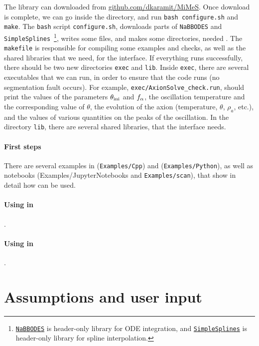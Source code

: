 \documentclass[11pt,a4paper]{article}
\begin{document}
The library can downloaded from \href{https://github.com/dkaramit/MiMeS}{github.com/dkaramit/MiMeS}. Once download is complete, we can go inside the \mimes directory, and run {\tt bash configure.sh} and  {\tt make}.  The {\tt bash} script {\tt configure.sh}, downloads parts of {\tt NaBBODES} and {\tt SimpleSplines}~\footnote{\href{https://github.com/dkaramit/NaBBODES}{\tt NaBBODES} is header-only library for ODE integration, and \href{https://github.com/dkaramit/SimpleSplines}{\tt SimpleSplines} is header-only library for spline interpolation.}, writes some files, and  makes some directories, needed \mimes. The {\tt makefile} is responsible for compiling some examples and checks, as well as the shared libraries that we need, for the \PY interface.  If everything runs successfully, there should be two new directories {\tt exec} and {\tt lib}. Inside {\tt exec}, there are several executables that we can run, in order to ensure that the code runs (\eg no segmentation fault occurs). For example, {\tt exec/AxionSolve\_check.run}, should print the values of the parameters $\theta_{\rm ini}{}$ and $f_{\alpha}{}$, the oscillation temperature and the corresponding value of $\theta$, the evolution of the axion (\eg temperature, $\theta$, $\rho_a$, etc.), and the values of various quantities on the peaks of the oscillation.  In the directory {\tt lib}, there are several shared libraries, that the \PY interface needs.

\paragraph{First steps} There are several examples in \CPP ({\tt Examples/Cpp}) and \PY ({\tt Examples/Python}), as well as \JUPY  notebooks ({Examples/JupyterNotebooks} and {\tt Examples/scan}), that show in detail how \mimes can be used.

\paragraph{Using \mimes in \CPP} .

\paragraph{Using \mimes in \PY} .


\section{Assumptions and user input}\label{sec:assumptions}
\setcounter{equation}{0}
\end{document}
